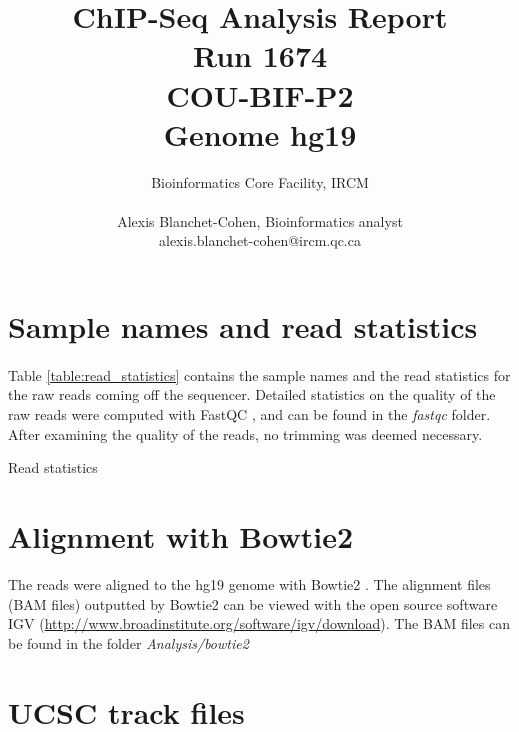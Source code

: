 \documentclass[12pt]{article}
\title{ ChIP-Seq Analysis Report \\ Run 1674 \\ COU-BIF-P2 \\ Genome hg19 }
\author{ Bioinformatics Core Facility, IRCM \\\\ Alexis Blanchet-Cohen, Bioinformatics analyst \\ alexis.blanchet-cohen@ircm.qc.ca}
\begin{document}
\maketitle
\thispagestyle{empty} %

\newpage
\tableofcontents
\newpage

\section{Sample names and read statistics}

\paragraph{} Table \ref{table:read_statistics} contains the sample names and the read statistics for the raw reads coming off the sequencer. 
Detailed statistics on the quality of the raw reads were computed with FastQC \cite{fastqc}, and can be found in the \emph{fastqc} folder. After examining the quality of the reads, no trimming was deemed necessary.

\begin{landscape}

\begin{table}[ht] 
\label{table:read_statistics}
\caption{Read statistics}
 \centering
{}
\renewcommand{\dtldisplaystarttab}{\toprule}
 \renewcommand{\dtldisplayafterhead}{\midrule}
 \renewcommand{\dtldisplayendtab}{\\\bottomrule}

\end{table}

\end{landscape}

\section{Alignment with Bowtie2}

The reads were aligned to the hg19 genome with Bowtie2 \cite{bowtie2}. 
The alignment files (BAM files) outputted by Bowtie2 can be viewed with the open source software IGV (\url{http://www.broadinstitute.org/software/igv/download}). The BAM files can be found in the folder \emph{Analysis/bowtie2}

\section{UCSC track files}
\end{document}
